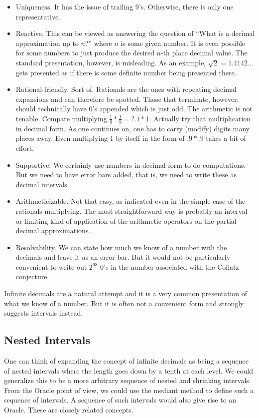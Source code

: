 \documentclass[12pt]{article}
\theoremstyle{remark}
\begin{document}
\begin{itemize}
    \item Uniqueness. It has the issue of trailing 9's. Otherwise, there is only one representative. 
    \item Reactive. This can be viewed as answering the question of ``What is a decimal approximation up to $n$?'' where $n$ is some given number. It is even possible for some numbers to just produce the desired $n$-th place decimal value. The standard presentation, however, is misleading. As an example, $\sqrt{2} = 1.4142...$ gets presented as if there is some definite number being presented there. 
    \item Rational-friendly. Sort of. Rationals are the ones with repeating decimal expansions and can therefore be spotted. Those that terminate, however, should technically have 0's appended which is just odd. The arithmetic is not tenable. Compare multiplying $\tfrac{1}{9}*\tfrac{1}{9} =? .\bar{1} * \bar{1}$. Actually try that multiplication in decimal form. As one continues on, one has to carry (modify) digits many places away. Even multiplying 1 by itself in the form of $.\bar{9}*.\bar{9}$ takes a bit of effort. 
    \item Supportive. We certainly use numbers in decimal form to do computations. But we need to have error bars added, that is, we need to write these as decimal intervals. 
    \item Arithmeticizable. Not that easy, as indicated even in the simple case of the rationals multiplying. The most straightforward way is probably an interval or limiting kind of application of the arithmetic operators on the partial decimal approximations. 
    \item Resolvability. We can state how much we know of a number with the decimals and leave it as an error bar. But it would not be particularly convenient to write out $2^{68}$ 0's in the number associated with the Collatz conjecture. 
\end{itemize}

Infinite decimals are a natural attempt and it is a very common presentation of what we know of a number. But it is often not a convenient form and strongly suggests intervals instead. 

\subsection{Nested Intervals}

One can think of expanding the concept of infinite decimals as being a sequence of nested intervals where the length goes down by a tenth at each level. We could generalize this to be a more arbitrary sequence of nested and shrinking intervals. From the Oracle point of view, we could use the mediant method to define such a sequence of intervals. A sequence of such intervals would also give rise to an Oracle. These are closely related concepts. 
\end{document}
